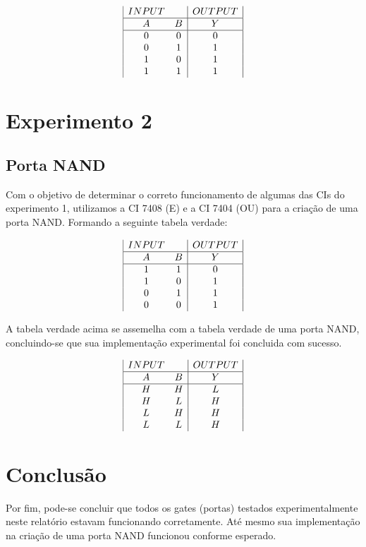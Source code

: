 \documentclass{article}
\begin{document}
\begin{displaymath}
\begin{array}{|c c|c|}
INPUT & & OUTPUT\\
\hline
A & B & Y\\
\hline %
0 & 0 & 0\\
0 & 1 & 1\\
1 & 0 & 1\\
1 & 1 & 1\\
\end{array}
\end{displaymath}

\section{Experimento 2}
\subsection{Porta NAND}
Com o objetivo de determinar o correto funcionamento de algumas das CIs do experimento 1, utilizamos a CI 7408 (E) e a CI 7404 (OU) para a criação de uma porta NAND. Formando a seguinte tabela verdade:

\begin{displaymath}
\begin{array}{|c c|c|}
INPUT & & OUTPUT\\
\hline
A & B & Y\\
\hline %
1 & 1 & 0\\
1 & 0 & 1\\
0 & 1 & 1\\
0 & 0 & 1\\
\end{array}
\end{displaymath}

A tabela verdade acima se assemelha com a tabela verdade de uma porta NAND, concluindo-se que sua implementação experimental foi concluida com sucesso.

\begin{displaymath}
\begin{array}{|c c|c|}
INPUT & & OUTPUT\\
\hline
A & B & Y\\
\hline %
H & H & L\\
H & L & H\\
L & H & H\\
L & L & H\\
\end{array}
\end{displaymath}


\section{Conclusão}

Por fim, pode-se concluir que todos os gates (portas) testados experimentalmente neste relatório estavam funcionando corretamente. Até mesmo sua implementação na criação de uma porta NAND funcionou conforme esperado.

\medskip
\end{document}
